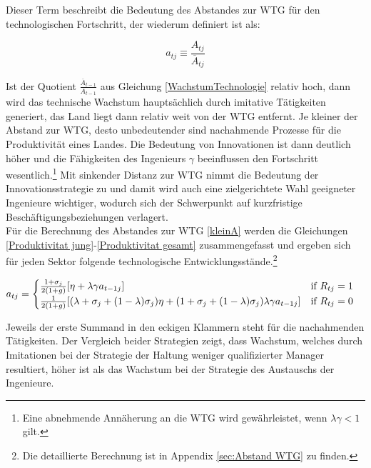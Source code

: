 Dieser Term beschreibt die Bedeutung des Abstandes zur WTG für den technologischen Fortschritt, der wiederum definiert ist als: 


	\begin{equation}
		a_{tj}\equiv\frac{A_{tj}}{\overline{A}_{tj}}\label{kleinA}
	\end{equation}


Ist der Quotient $\frac{\overline{A}_{t-1}}{A_{t-1}}$ aus Gleichung \eqref{WachstumTechnologie} relativ hoch, dann wird das technische Wachstum hauptsächlich durch imitative Tätigkeiten generiert, das Land liegt dann relativ weit von der WTG entfernt. Je kleiner der Abstand zur WTG, desto unbedeutender sind nachahmende Prozesse für die Produktivität eines Landes. Die Bedeutung von Innovationen ist dann deutlich höher und die Fähigkeiten des Ingenieurs $\gamma$ beeinflussen den Fortschritt wesentlich.\footnote{Eine abnehmende Annäherung an die WTG wird gewährleistet, wenn $\lambda\gamma<1$ gilt.}
Mit sinkender Distanz zur WTG nimmt die Bedeutung der Innovationsstrategie zu und damit wird auch eine zielgerichtete Wahl geeigneter Ingenieure wichtiger, wodurch sich der Schwerpunkt auf kurzfristige Beschäftigungsbeziehungen verlagert.\\


Für die Berechnung des Abstandes zur WTG \eqref{kleinA} werden die Gleichungen \eqref{Produktivitat jung}-\eqref{Produktivitat gesamt} zusammengefasst und ergeben sich für jeden Sektor folgende technologische Entwicklungsstände.\footnote{Die detaillierte Berechnung ist in Appendix \ref{sec:Abstand WTG} zu finden.}


	\begin{equation}
		a_{tj}=\begin{cases}\frac{1+\sigma_j}{2(1+g)}[\eta+\lambda \gamma a_{t-1j}] \hfill\text{if  } R_{tj}=1 \\
		\frac{1}{2(1+g)}[(\lambda+\sigma_j+(1-\lambda)\sigma_j)\eta+(1+\sigma_j+(1-\lambda)\sigma_j)\lambda\gamma a_{t-1 j}] \quad\hfill\text{if   }R_{tj}=0
		\end{cases}\label{Abstand WTG}
	\end{equation}


Jeweils der erste Summand in den eckigen Klammern steht für die nachahmenden Tätigkeiten. Der Vergleich beider Strategien zeigt, dass Wachstum, welches durch Imitationen bei der Strategie der Haltung weniger qualifizierter Manager resultiert, höher ist als das Wachstum bei der Strategie des Austauschs der Ingenieure.

